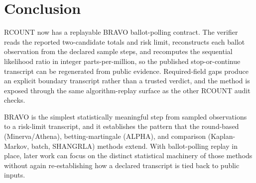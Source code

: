 \section{Conclusion}

RCOUNT now has a replayable BRAVO ballot-polling contract. The verifier reads
the reported two-candidate totals and risk limit, reconstructs each ballot
observation from the declared sample steps, and recomputes the sequential
likelihood ratio in integer parts-per-million, so the published stop-or-continue
transcript can be regenerated from public evidence. Required-field gaps produce
an explicit boundary transcript rather than a trusted verdict, and the method is
exposed through the same algorithm-replay surface as the other RCOUNT audit
checks.

BRAVO is the simplest statistically meaningful step from sampled observations to
a risk-limit transcript, and it establishes the pattern that the round-based
(Minerva/Athena), betting-martingale (ALPHA), and comparison (Kaplan-Markov,
batch, SHANGRLA) methods extend. With ballot-polling replay in place, later work
can focus on the distinct statistical machinery of those methods without again
re-establishing how a declared transcript is tied back to public inputs.

